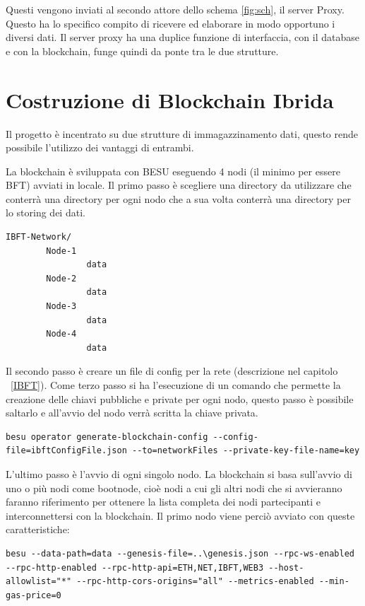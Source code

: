 \documentclass[11pt,a4paper,titlepage,twoside,openright]{report}
\begin{document}
Questi vengono inviati al secondo attore dello schema \ref{fig:sch}, il server Proxy. Questo ha lo specifico compito di ricevere ed elaborare in modo opportuno i diversi dati. Il server proxy ha una duplice funzione di interfaccia, con il database e con la blockchain, funge quindi da ponte tra le due strutture.

\section{Costruzione di Blockchain Ibrida}
Il progetto è incentrato su due strutture di immagazzinamento dati, questo rende possibile l'utilizzo dei vantaggi di entrambi.

La blockchain è sviluppata con BESU eseguendo 4 nodi (il minimo per essere BFT) avviati in locale.
Il primo passo è scegliere una directory da utilizzare che conterrà una directory per ogni nodo che a sua volta conterrà una directory per lo storing dei dati.
\begin{lstlisting}[language=command.com]
IBFT-Network/
		Node-1
				data
		Node-2
				data
		Node-3
				data
		Node-4
				data
\end{lstlisting}

Il secondo passo è creare un file di config per la rete (descrizione nel capitolo ~\ref{IBFT}).
Come terzo passo si ha l'esecuzione di un comando che permette la creazione delle chiavi pubbliche e private per ogni nodo, questo passo è possibile saltarlo e all'avvio del nodo verrà scritta la chiave privata.
\begin{lstlisting}[language=command.com]
besu operator generate-blockchain-config --config-file=ibftConfigFile.json --to=networkFiles --private-key-file-name=key
\end{lstlisting}

L'ultimo passo è l'avvio di ogni singolo nodo. La blockchain si basa sull'avvio di uno o più nodi come bootnode, cioè nodi a cui gli altri nodi che si avvieranno faranno riferimento per ottenere la lista completa dei nodi partecipanti e interconnettersi con la blockchain.
Il primo nodo viene perciò avviato con queste caratteristiche:
\begin{lstlisting}[language=command.com]
besu --data-path=data --genesis-file=..\genesis.json --rpc-ws-enabled --rpc-http-enabled --rpc-http-api=ETH,NET,IBFT,WEB3 --host-allowlist="*" --rpc-http-cors-origins="all" --metrics-enabled --min-gas-price=0
\end{lstlisting}
\end{document}
